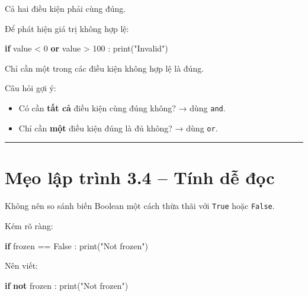 \documentclass[
  11pt,
  a4paper,
]{article}
\newenvironment{Shaded}{}{}
\newcommand{\BuiltInTok}[1]{\textcolor[rgb]{0.00,0.50,0.00}{#1}}
\newcommand{\ControlFlowTok}[1]{\textcolor[rgb]{0.00,0.44,0.13}{\textbf{#1}}}
\newcommand{\DecValTok}[1]{\textcolor[rgb]{0.25,0.63,0.44}{#1}}
\newcommand{\KeywordTok}[1]{\textcolor[rgb]{0.00,0.44,0.13}{\textbf{#1}}}
\newcommand{\NormalTok}[1]{#1}
\newcommand{\OperatorTok}[1]{\textcolor[rgb]{0.40,0.40,0.40}{#1}}
\newcommand{\StringTok}[1]{\textcolor[rgb]{0.25,0.44,0.63}{#1}}
\newcommand{\VariableTok}[1]{\textcolor[rgb]{0.10,0.09,0.49}{#1}}
\providecommand{\tightlist}{%
  \setlength{\itemsep}{0pt}\setlength{\parskip}{0pt}}
\begin{document}
Cả hai điều kiện phải cùng đúng.

Để phát hiện giá trị không hợp lệ:

\begin{Shaded}
\begin{Highlighting}[]
\ControlFlowTok{if}\NormalTok{ value }\OperatorTok{\textless{}} \DecValTok{0} \KeywordTok{or}\NormalTok{ value }\OperatorTok{\textgreater{}} \DecValTok{100}\NormalTok{ :}
    \BuiltInTok{print}\NormalTok{(}\StringTok{"Invalid"}\NormalTok{)}
\end{Highlighting}
\end{Shaded}

Chỉ cần một trong các điều kiện không hợp lệ là đúng.

Câu hỏi gợi ý:

\begin{itemize}
\tightlist
\item
  Có cần \textbf{tất cả} điều kiện cùng đúng không? → dùng \texttt{and}.
\item
  Chỉ cần \textbf{một} điều kiện đúng là đủ không? → dùng \texttt{or}.
\end{itemize}

\begin{center}\rule{0.5\linewidth}{0.5pt}\end{center}

\section{Mẹo lập trình 3.4 -- Tính dễ
đọc}\label{mux1eb9o-lux1eadp-truxecnh-3.4-tuxednh-dux1ec5-ux111ux1ecdc}

Không nên so sánh biến Boolean một cách thừa thãi với \texttt{True} hoặc
\texttt{False}.

Kém rõ ràng:

\begin{Shaded}
\begin{Highlighting}[]
\ControlFlowTok{if}\NormalTok{ frozen }\OperatorTok{==} \VariableTok{False}\NormalTok{ :}
    \BuiltInTok{print}\NormalTok{(}\StringTok{"Not frozen"}\NormalTok{)}
\end{Highlighting}
\end{Shaded}

Nên viết:

\begin{Shaded}
\begin{Highlighting}[]
\ControlFlowTok{if} \KeywordTok{not}\NormalTok{ frozen :}
    \BuiltInTok{print}\NormalTok{(}\StringTok{"Not frozen"}\NormalTok{)}
\end{Highlighting}
\end{Shaded}
\end{document}
